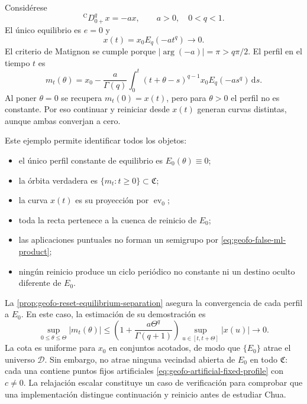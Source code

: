 Considérese
\begin{equation}
 {}^{\mathrm C}D_{0+}^{q}x=-a x,
 \qquad a>0,\quad 0<q<1.
 \label{eq:geofo-relaxation}
\end{equation}
El único equilibrio es \(e=0\) y
\begin{equation}
 x(t)=x_0E_q(-at^q)\longrightarrow0.
 \label{eq:geofo-relaxation-solution}
\end{equation}
El criterio de Matignon se cumple porque
\(|\arg(-a)|=\pi>q\pi/2\). El perfil en el tiempo \(t\) es
\begin{equation}
 m_t(\theta)=x_0-
 \frac a{\Gamma(q)}\int_0^t
 (t+\theta-s)^{q-1}x_0E_q(-as^q)\,\mathrm ds.
 \label{eq:geofo-relaxation-profile}
\end{equation}
Al poner \(\theta=0\) se recupera \(m_t(0)=x(t)\), pero para
\(\theta>0\) el perfil no es constante. Por eso continuar y reiniciar desde
\(x(t)\) generan curvas distintas, aunque ambas converjan a cero.

Este ejemplo permite identificar todos los objetos:
\begin{itemize}
 \item el único perfil constante de equilibrio es \(E_0(\theta)\equiv0\);
 \item la órbita verdadera es \(\{m_t:t\geq0\}\subset\mathfrak C\);
 \item la curva \(x(t)\) es su proyección por \(\operatorname{ev}_0\);
 \item toda la recta pertenece a la cuenca de reinicio de \(E_0\);
 \item las aplicaciones puntuales no forman un semigrupo por
 \cref{eq:geofo-false-ml-product};
 \item ningún reinicio produce un ciclo periódico no constante ni un
 destino oculto diferente de \(E_0\).
\end{itemize}
La \cref{prop:geofo-reset-equilibrium-separation} asegura la convergencia
de cada perfil a \(E_0\). En este caso, la estimación de su demostración es
\[
 \sup_{0\leq\theta\leq\Theta}|m_t(\theta)|
 \leq\left(1+\frac{a\Theta^q}{\Gamma(q+1)}\right)
       \sup_{u\in[t,t+\Theta]}|x(u)|\longrightarrow0.
\]
La cota es uniforme para \(x_0\) en conjuntos acotados, de modo que
\(\{E_0\}\) atrae el universo \(\mathcal D\). Sin embargo, no atrae
ninguna vecindad abierta de \(E_0\) en todo \(\mathfrak C\): cada una
contiene puntos fijos artificiales
\cref{eq:geofo-artificial-fixed-profile} con \(c\ne0\).
La relajación escalar constituye un caso de verificación para comprobar que
una implementación distingue continuación y reinicio antes de estudiar Chua.

